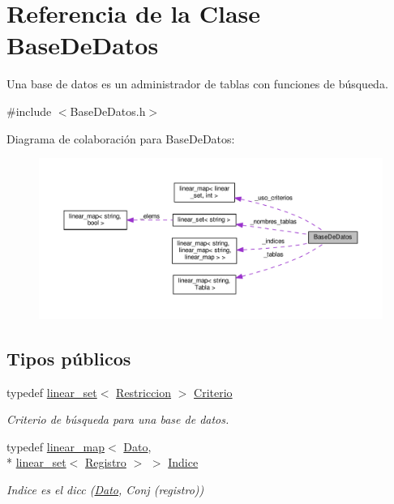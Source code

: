 \hypertarget{classBaseDeDatos}{\section{Referencia de la Clase Base\-De\-Datos}
\label{classBaseDeDatos}
}


Una base de datos es un administrador de tablas con funciones de búsqueda.  




{\ttfamily \#include $<$Base\-De\-Datos.\-h$>$}



Diagrama de colaboración para Base\-De\-Datos\-:\nopagebreak
\begin{figure}[H]
\begin{center}
\leavevmode
\includegraphics[width=350pt]{classBaseDeDatos__coll__graph}
\end{center}
\end{figure}
\subsection*{Tipos públicos}
\begin{DoxyCompactItemize}
\item 
\hypertarget{classBaseDeDatos_a6742a222e87623bc92a810a693fb337b}{typedef \hyperlink{classlinear__set}{linear\-\_\-set}$<$ \hyperlink{classRestriccion}{Restriccion} $>$ \hyperlink{classBaseDeDatos_a6742a222e87623bc92a810a693fb337b}{Criterio}}\label{classBaseDeDatos_a6742a222e87623bc92a810a693fb337b}

\begin{DoxyCompactList}\small\item\em Criterio de búsqueda para una base de datos. \end{DoxyCompactList}\item 
\hypertarget{classBaseDeDatos_a1e94d358c9ef6e71f9d6bfb662e553cb}{typedef \hyperlink{classlinear__map}{linear\-\_\-map}$<$ \hyperlink{classDato}{Dato}, \\*
\hyperlink{classlinear__set}{linear\-\_\-set}$<$ \hyperlink{classRegistro}{Registro} $>$ $>$ \hyperlink{classBaseDeDatos_a1e94d358c9ef6e71f9d6bfb662e553cb}{Indice}}\label{classBaseDeDatos_a1e94d358c9ef6e71f9d6bfb662e553cb}

\begin{DoxyCompactList}\small\item\em Indice es el dicc (\hyperlink{classDato}{Dato}, Conj (registro)) \end{DoxyCompactList}\end{DoxyCompactItemize}
